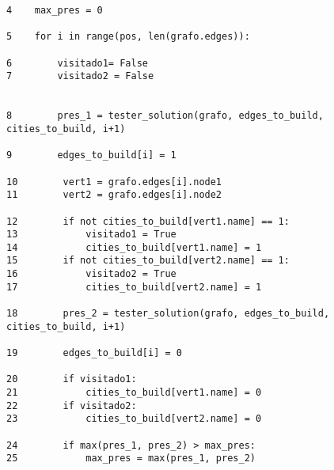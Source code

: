\documentclass[runningheads,a4paper]{llncs}
\begin{document}
{\begin{lstlisting}
4    max_pres = 0

5    for i in range(pos, len(grafo.edges)):

6        visitado1= False
7        visitado2 = False
        

8        pres_1 = tester_solution(grafo, edges_to_build, cities_to_build, i+1)

9        edges_to_build[i] = 1

10        vert1 = grafo.edges[i].node1
11        vert2 = grafo.edges[i].node2

12        if not cities_to_build[vert1.name] == 1:
13            visitado1 = True
14            cities_to_build[vert1.name] = 1
15        if not cities_to_build[vert2.name] == 1:
16            visitado2 = True
17            cities_to_build[vert2.name] = 1

18        pres_2 = tester_solution(grafo, edges_to_build, cities_to_build, i+1)

19        edges_to_build[i] = 0

20        if visitado1:
21            cities_to_build[vert1.name] = 0
22        if visitado2:
23            cities_to_build[vert2.name] = 0

24        if max(pres_1, pres_2) > max_pres:
25            max_pres = max(pres_1, pres_2)


\end{lstlisting}}
\end{document}
